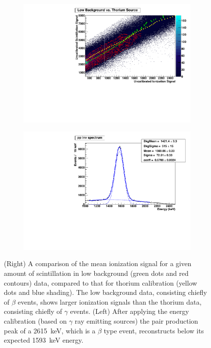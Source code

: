 \documentclass[herrin-thesis.tex]{subfiles}
\begin{document}
\begin{figure}
\centering
	\begin{subfigure}[c]{0.48\textwidth}
	\centering
	\includegraphics[width=\textwidth]{./plots/analysis_beta_gamma_comparison.pdf}
	\end{subfigure}\hfill%
	\begin{subfigure}[c]{0.48\textwidth}
	\centering
	\includegraphics[width=\textwidth]{./plots/analysis_calibrated_pp_peak.pdf}
	\end{subfigure}
	\caption[Evidence that \(\beta\) and \(\gamma\) events might have different energy scales]{(Right) A comparison of the mean ionization signal for a given amount of scintillation in low background (green dots and red contours) data, compared to that for thorium calibration (yellow dots and blue shading). The low background data, consisting chiefly of \(\beta\) events, shows larger ionization signals than the thorium data, consisting chiefly of \(\gamma\) events. (Left) After applying the energy calibration (based on \(\gamma\) ray emitting sources) the pair production peak of a \SI{2615}{\keV}, which is a \(\beta\) type event, reconstructs below its expected \SI{1593}{\keV} energy.}
\label{fig:analysis_beta_scale}
\end{figure}
\end{document}
